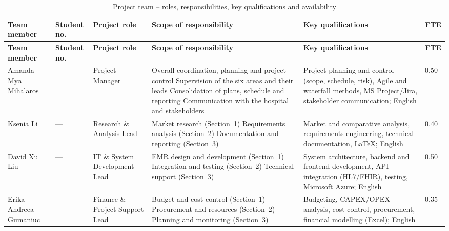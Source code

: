 \begin{longtable}{|L{2.3cm}|C{1.4cm}|L{2.6cm}|L{2.9cm}|L{2.9cm}|C{0.8cm}|}
\caption{Project team -- roles, responsibilities, key qualifications and availability}
\label{tab:project_team} \\
\hline

\textbf{Team member} &
\textbf{Student no.} &
\textbf{Project role} &
\textbf{Scope of responsibility} &
\textbf{Key qualifications} &
\textbf{FTE} \\
\hline

\endfirsthead

\hline

\textbf{Team member} &
\textbf{Student no.} &
\textbf{Project role} &
\textbf{Scope of responsibility} &
\textbf{Key qualifications} &
\textbf{FTE} \\
\hline

\endhead

Amanda Mya Mihalaros &
--- &
Project Manager &
Overall coordination, planning and project control\newline
Supervision of the six areas and their leads\newline
Consolidation of plans, schedule and reporting\newline
Communication with the hospital and stakeholders &
Project planning and control (scope, schedule, risk), Agile and waterfall methods,
MS Project/Jira, stakeholder communication; English &
0.50 \\
\hline

Ksenia Li &
--- &
Research \& Analysis Lead &
Market research (Section~1)\newline
Requirements analysis (Section~2)\newline
Documentation and reporting (Section~3) &
Market and comparative analysis, requirements engineering, technical documentation,
\LaTeX; English &
0.40 \\
\hline

David Xu Liu &
--- &
IT \& System Development Lead &
EMR design and development (Section~1)\newline
Integration and testing (Section~2)\newline
Technical support (Section~3) &
System architecture, backend and frontend development, API integration
(HL7/FHIR), testing, Microsoft Azure; English &
0.50 \\
\hline

Erika Andreea Gumaniuc &
--- &
Finance \& Project Support Lead &
Budget and cost control (Section~1)\newline
Procurement and resources (Section~2)\newline
Planning and monitoring (Section~3) &
Budgeting, CAPEX/OPEX analysis, cost control, procurement, financial modelling
(Excel); English &
0.35 \\
\hline


\end{longtable}
